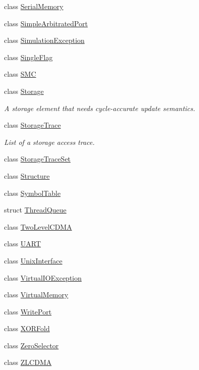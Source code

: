 \begin{DoxyCompactItemize}
class \hyperlink{class_simulator_1_1_serial_memory}{Serial\+Memory}
\item 
class \hyperlink{class_simulator_1_1_simple_arbitrated_port}{Simple\+Arbitrated\+Port}
\item 
class \hyperlink{class_simulator_1_1_simulation_exception}{Simulation\+Exception}
\item 
class \hyperlink{class_simulator_1_1_single_flag}{Single\+Flag}
\item 
class \hyperlink{class_simulator_1_1_s_m_c}{S\+M\+C}
\item 
class \hyperlink{class_simulator_1_1_storage}{Storage}
\begin{DoxyCompactList}\small\item\em A storage element that needs cycle-\/accurate update semantics. \end{DoxyCompactList}\item 
class \hyperlink{class_simulator_1_1_storage_trace}{Storage\+Trace}
\begin{DoxyCompactList}\small\item\em List of a storage access trace. \end{DoxyCompactList}\item 
class \hyperlink{class_simulator_1_1_storage_trace_set}{Storage\+Trace\+Set}
\item 
class \hyperlink{singleton_simulator_1_1_structure}{Structure}
\item 
class \hyperlink{class_simulator_1_1_symbol_table}{Symbol\+Table}
\item 
struct \hyperlink{struct_simulator_1_1_thread_queue}{Thread\+Queue}
\item 
class \hyperlink{class_simulator_1_1_two_level_c_d_m_a}{Two\+Level\+C\+D\+M\+A}
\item 
class \hyperlink{class_simulator_1_1_u_a_r_t}{U\+A\+R\+T}
\item 
class \hyperlink{class_simulator_1_1_unix_interface}{Unix\+Interface}
\item 
class \hyperlink{class_simulator_1_1_virtual_i_o_exception}{Virtual\+I\+O\+Exception}
\item 
class \hyperlink{class_simulator_1_1_virtual_memory}{Virtual\+Memory}
\item 
class \hyperlink{class_simulator_1_1_write_port}{Write\+Port}
\item 
class \hyperlink{class_simulator_1_1_x_o_r_fold}{X\+O\+R\+Fold}
\item 
class \hyperlink{class_simulator_1_1_zero_selector}{Zero\+Selector}
\item 
class \hyperlink{class_simulator_1_1_z_l_c_d_m_a}{Z\+L\+C\+D\+M\+A}
\end{DoxyCompactItemize}

